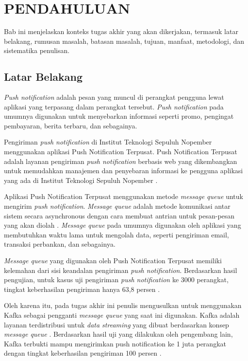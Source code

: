 \vspace{0ex}
\chapter {PENDAHULUAN}
\par Bab ini menjelaskan konteks tugas akhir yang akan dikerjakan, termasuk latar belakang, rumusan masalah, batasan masalah, tujuan, manfaat, metodologi, dan sistematika penulisan.

\section{Latar Belakang}
\par \textit{Push notification} adalah pesan yang muncul di perangkat pengguna lewat aplikasi yang terpasang dalam perangkat tersebut. \textit{Push notification} pada umumnya digunakan untuk menyebarkan informasi seperti promo, pengingat pembayaran, berita terbaru, dan sebagainya.
\par Pengiriman \textit{push notification} di Institut Teknologi Sepuluh Nopember menggunakan aplikasi Push Notification Terpusat. Push Notification Terpusat adalah layanan pengiriman \textit{push notification} berbasis web yang dikembangkan untuk memudahkan manajemen dan penyebaran informasi ke pengguna aplikasi yang ada di Institut Teknologi Sepuluh Nopember \cite{application-thesis}.
\par Aplikasi Push Notification Terpusat menggunakan metode \textit{message queue} untuk mengirim \textit{push notification}. \textit{Message queue} adalah metode komunikasi antar sistem secara asynchronous dengan cara membuat antrian untuk pesan-pesan yang akan diolah \cite{message-queue-online}. \textit{Message queue} pada umumnya digunakan oleh aplikasi yang membutuhkan waktu lama untuk mengolah data, seperti pengiriman email, transaksi perbankan, dan sebagainya.
\par \textit{Message queue} yang digunakan oleh Push Notification Terpusat memiliki kelemahan dari sisi keandalan pengiriman \textit{push notification}. Berdasarkan hasil pengujian, untuk kasus uji pengiriman \textit{push notification} ke 3000 perangkat, tingkat keberhasilan pengiriman hanya 63,8 persen \cite{application-thesis}.
\par Oleh karena itu, pada tugas akhir ini penulis mengusulkan untuk menggunakan Kafka sebagai pengganti \textit{message queue} yang saat ini digunakan. Kafka adalah layanan terdistribusi untuk \textit{data streaming} yang dibuat berdasarkan konsep \textit{message queue} \cite{kafka-online}. Berdasarkan hasil uji yang dilakukan oleh pengembang lain, Kafka terbukti mampu mengirimkan push notification ke 1 juta perangkat dengan tingkat keberhasilan pengiriman 100 persen \cite{prototype-article}.

